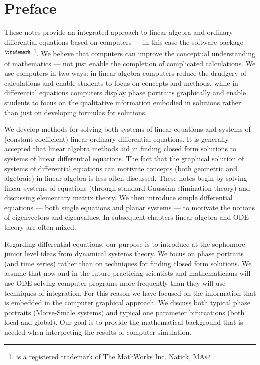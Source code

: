 
\section*{Preface}

These notes provide an integrated approach to linear algebra and ordinary 
differential equations based on computers --- in this case the software 
package \Matlabp$^\trademark$ \footnote{\Matlab is a registered trademark
of The MathWorks Inc. Natick, MA}.   We believe that computers can improve 
the conceptual understanding of mathematics --- not just enable the 
completion of complicated calculations.  We use computers in two ways:  in 
linear algebra computers reduce the drudgery of calculations and 
enable students to focus on concepts and methods, while in differential 
equations computers display phase portraits graphically and enable 
students to focus on the qualitative information embodied in solutions 
rather than just on developing formulas for solutions.

We develop methods for solving both systems of linear 
equations and systems of (constant coefficient) linear ordinary 
differential equations.  It is generally accepted that linear algebra 
methods aid in finding closed form solutions to systems of linear 
differential equations.  The fact that the graphical solution of systems 
of differential equations can motivate concepts (both geometric and algebraic)
in linear algebra is less often discussed.  These notes begin by solving linear 
systems of equations (through standard Gaussian elimination theory) and 
discussing elementary matrix theory.  We then introduce simple differential 
equations --- both single equations and planar systems --- to motivate the 
notions of eigenvectors and eigenvalues. In subsequent chapters linear algebra 
and ODE theory are often mixed.  

Regarding differential equations, our purpose is to introduce at the 
sophomore -- junior level ideas from dynamical systems theory.  We focus on 
phase portraits (and time series) rather than on techniques for finding
closed form solutions.  We assume that now and in the future practicing
scientists and mathematicians will use ODE solving computer programs
more frequently than they will use techniques of integration.  For this
reason we have focused on the information that is embedded in the computer  
graphical approach.  We discuss both typical phase portraits
(Morse-Smale systems) and typical one parameter bifurcations (both local 
and global).   Our goal is to provide the mathematical background that is
needed when interpreting the results of computer simulation.

